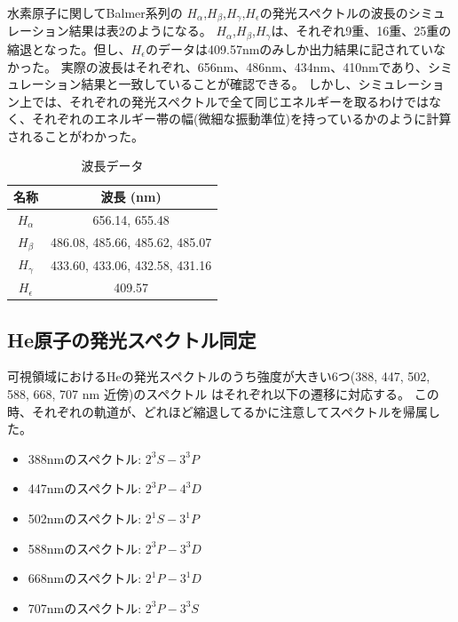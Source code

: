 \documentclass[a4j,twocolumn]{jsarticle}
\begin{document}
水素原子に関してBalmer系列の $H_\alpha$,$H_\beta$,$H_\gamma$,$H_\epsilon$の発光スペクトルの波長のシミュレーション結果は表2のようになる。
$H_\alpha$,$H_\beta$,$H_\gamma$は、それぞれ9重、16重、25重の縮退となった。但し、$H_\epsilon$のデータは409.57nmのみしか出力結果に記されていなかった。
実際の波長はそれぞれ、656nm、486nm、434nm、410nmであり、シミュレーション結果と一致していることが確認できる。
しかし、シミュレーション上では、それぞれの発光スペクトルで全て同じエネルギーを取るわけではなく、それぞれのエネルギー帯の幅(微細な振動準位)を持っているかのように計算されることがわかった。


\begin{table}[h]
    \centering
    \begin{tabular}{|c|c|}
        \hline
        \textbf{名称} & \textbf{波長 (nm)} \\
        \hline
        $H_\alpha$ & 656.14, 655.48 \\
        \hline
        $H_\beta$ & 486.08, 485.66, 485.62, 485.07 \\
        \hline
        $H_\gamma$ & 433.60, 433.06, 432.58, 431.16 \\
        \hline
        $H_\epsilon$ & 409.57 \\
        \hline
    \end{tabular}
    \caption{波長データ}
\end{table}





\subsection*{He原子の発光スペクトル同定}

可視領域におけるHeの発光スペクトルのうち強度が大きい6つ(388, 447, 502, 588, 668, 707 nm 近傍)のスペクトル
はそれぞれ以下の遷移に対応する。
この時、それぞれの軌道が、どれほど縮退してるかに注意してスペクトルを帰属した。

\begin{itemize}
    \item 388nmのスペクトル: $2^3S-3^3P$
    \item 447nmのスペクトル: $2^3P-4^3D$
    \item 502nmのスペクトル: $2^1S-3^1P$
    \item 588nmのスペクトル: $2^3P-3^3D$
    \item 668nmのスペクトル: $2^1P-3^1D$
    \item 707nmのスペクトル: $2^3P-3^3S$
\end{itemize}
\end{document}
